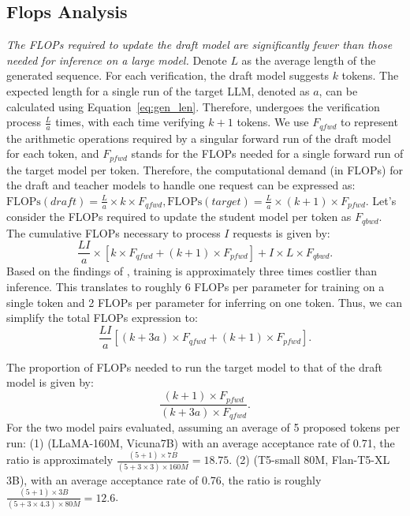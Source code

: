 \subsection{Flops Analysis}
\label{appendix:flops}
\emph{The FLOPs required to update the draft model are significantly fewer than those needed for inference on a large model.}
Denote \(L\) as the average length of the generated sequence. 
For each verification, the draft model suggests \(k\) tokens. 
The expected length for a single run of the target LLM, denoted as \(a\), can be calculated using Equation~\ref{eq:gen_len}. 
Therefore, \tool undergoes the verification process \(\frac{L}{a}\) times, with each time verifying $k+1$ tokens.
We use \(F_{qfwd}\) to represent the arithmetic operations required by a singular forward run of the draft model for each token, 
and \(F_{pfwd}\) stands for the FLOPs needed for a single forward run of the target model per token.
Therefore, the computational demand (in FLOPs) for the draft and teacher models to handle one request can be expressed as:
$
\text{FLOPs}(draft)  = \frac{L}{a} \times k \times F_{qfwd},
\text{FLOPs}(target) = \frac{L}{a} \times (k+1) \times F_{pfwd}.
$
Let's consider the FLOPs required to update the student model per token as \(F_{qbwd}\). The cumulative FLOPs necessary to process \(I\) requests is given by:
\[
\frac{LI}{a} \times \left[k \times F_{qfwd} + (k+1) \times F_{pfwd}\right] + I \times L \times F_{qbwd}.
\]
Based on the findings of \cite{kaplan2020scaling}, training is approximately three times costlier than inference. This translates to roughly 6 FLOPs per parameter for training on a single token and 2 FLOPs per parameter for inferring on one token. Thus, we can simplify the total FLOPs expression to:
\begin{equation}
    \frac{LI}{a}\left[(k + 3a) \times F_{qfwd} + (k+1) \times F_{pfwd}\right].
\end{equation}

The proportion of FLOPs needed to run the target model to that of the draft model is given by:
\[
\frac{(k+1)\times F_{pfwd}}{(k+3a)\times F_{qfwd}}.
\]
For the two model pairs evaluated, assuming an average of 5 proposed tokens per run: 
(1) (LLaMA-160M, Vicuna7B) with an average acceptance rate of 0.71, the ratio is approximately \( \frac{(5+1) \times 7B}{(5+3 \times 3) \times 160M} = 18.75 \).
(2) (T5-small 80M, Flan-T5-XL 3B), with an average acceptance rate of 0.76, the ratio is roughly \( \frac{(5+1) \times 3B}{(5+3 \times 4.3) \times 80M} = 12.6 \).

